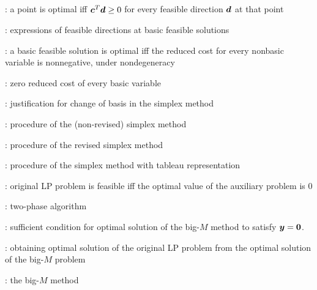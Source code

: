 \subsection*{}
\item {}: a point is optimal iff
\(\bm{c}^{T}\bm{d}\ge 0\) for every feasible direction \(\bm{d}\) at that
point
\item {}: expressions of feasible directions at basic feasible solutions
\item {}: a basic feasible solution is optimal iff the
reduced cost for every nonbasic variable is nonnegative, under nondegeneracy
\item {}: zero reduced cost of every basic variable
\item {}: justification for change of basis in the simplex method
\item {}: procedure of the (non-revised) simplex method
\item {}: procedure of the revised simplex method
\item {}: procedure of the simplex method with tableau representation
\item {}: original LP problem is feasible iff the optimal value of the auxiliary problem is \(0\)
\item {}: two-phase algorithm
\item {}: sufficient condition for optimal solution of the big-\(M\) method to satisfy \(\bm{y}=\bm{0}\).
\item {}: obtaining optimal solution of the original LP problem from the optimal solution of the big-\(M\) problem
\item {}: the big-\(M\) method

